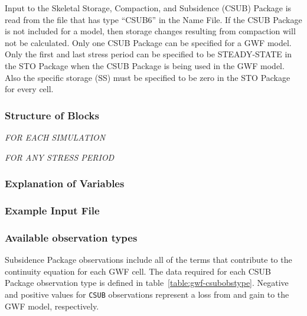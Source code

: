 Input to the Skeletal Storage, Compaction, and Subsidence (CSUB) Package is read from the file that has type ``CSUB6'' in the Name File.  If the CSUB Package is not included for a model, then storage changes resulting from compaction will not be calculated.  Only one CSUB Package can be specified for a GWF model. Only the first and last stress period can be specified to be STEADY-STATE in the STO Package when the CSUB Package is being used in the GWF model. Also the specific storage (SS) must be specified to be zero in the STO Package for every cell.

\vspace{5mm}
\subsubsection{Structure of Blocks}

\vspace{5mm}
\noindent \textit{FOR EACH SIMULATION}




\vspace{5mm}
\noindent \textit{FOR ANY STRESS PERIOD}

\packageperioddescription

\vspace{5mm}
\subsubsection{Explanation of Variables}
\begin{description}

\end{description}

\vspace{5mm}
\subsubsection{Example Input File}



\vspace{5mm}
\subsubsection{Available observation types}
Subsidence Package observations include all of the terms that contribute to the continuity equation for each GWF cell. The data required for each CSUB Package observation type is defined in table~\ref{table:gwf-csubobstype}. Negative and positive values for \texttt{CSUB} observations represent a loss from and gain to the GWF model, respectively.


